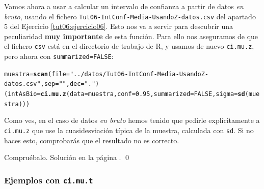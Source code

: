\documentclass[10pt,a4paper]{article}\usepackage[]{graphicx}\usepackage[]{color}
\makeatletter
\newcommand{\hlnum}[1]{\textcolor[rgb]{0.686,0.059,0.569}{#1}}%
\newcommand{\hlstr}[1]{\textcolor[rgb]{0.192,0.494,0.8}{#1}}%
\newcommand{\hlstd}[1]{\textcolor[rgb]{0.345,0.345,0.345}{#1}}%
\newcommand{\hlkwb}[1]{\textcolor[rgb]{0.69,0.353,0.396}{#1}}%
\newcommand{\hlkwc}[1]{\textcolor[rgb]{0.333,0.667,0.333}{#1}}%
\newcommand{\hlkwd}[1]{\textcolor[rgb]{0.737,0.353,0.396}{\textbf{#1}}}%
\newenvironment{kframe}{%
 \def\at@end@of@kframe{}%
 \ifinner\ifhmode%
  \def\at@end@of@kframe{\end{minipage}}%
  \begin{minipage}{\columnwidth}%
 \fi\fi%
 \def\FrameCommand##1{\hskip\@totalleftmargin \hskip-\fboxsep
 \colorbox{shadecolor}{##1}\hskip-\fboxsep
     \hskip-\linewidth \hskip-\@totalleftmargin \hskip\columnwidth}%
 \MakeFramed {\advance\hsize-\width
   \@totalleftmargin\z@ \linewidth\hsize
   \@setminipage}}%
 {\par\unskip\endMakeFramed%
 \at@end@of@kframe}
\newenvironment{knitrout}{}{} %
\newcounter {cont01}
\makeatother
\begin{document}
Vamos ahora a usar a calcular un intervalo de confianza a partir de datos {\em en bruto}, usando el fichero {\tt Tut06-IntConf-Media-UsandoZ-datos.csv} del apartado 5 del Ejercicio \ref{tut06:ejercicio06}. Esto nos va a servir para descubrir una peculiaridad {\bf muy importante} de esta función. Para ello nos aseguramos de que el fichero {\tt csv} está en el directorio de trabajo de R, y usamos de nuevo {\tt ci.mu.z}, pero ahora con {\tt summarized=FALSE}:
\begin{knitrout}
\color{fgcolor}\begin{kframe}
\begin{alltt}
\hlstd{muestra} \hlkwb{=} \hlkwd{scan}\hlstd{(}\hlkwc{file}\hlstd{=}\hlstr{"../datos/Tut06-IntConf-Media-UsandoZ-datos.csv"}\hlstd{,} \hlkwc{sep}\hlstd{=}\hlstr{" "}\hlstd{,} \hlkwc{dec}\hlstd{=}\hlstr{"."}\hlstd{)}
\hlstd{(intAsBio} \hlkwb{=} \hlkwd{ci.mu.z}\hlstd{(}\hlkwc{data}\hlstd{=muestra,} \hlkwc{conf}\hlstd{=}\hlnum{0.95}\hlstd{,} \hlkwc{summarized}\hlstd{=}\hlnum{FALSE}\hlstd{,} \hlkwc{sigma} \hlstd{=} \hlkwd{sd}\hlstd{(muestra)))}
\end{alltt}


{\ttfamily\noindent\bfseries{}}\end{kframe}
\end{knitrout}
Como ves, en el caso de datos {\em en bruto} hemos tenido que pedirle explícitamente a {\tt ci.mu.z} que use la cuasidesviación típica de la muestra, calculada con {\tt sd}. Si no haces esto, comprobarás que el resultado no es correcto.
\begin{ejercicio}
\label{tut06:ejercicio24}
Compruébalo. Solución en la página \pageref{tut06:ejercicio24:sol}.
\qed
\end{ejercicio}

\subsubsection*{Ejemplos con {\tt ci.mu.t}}
\end{document}
